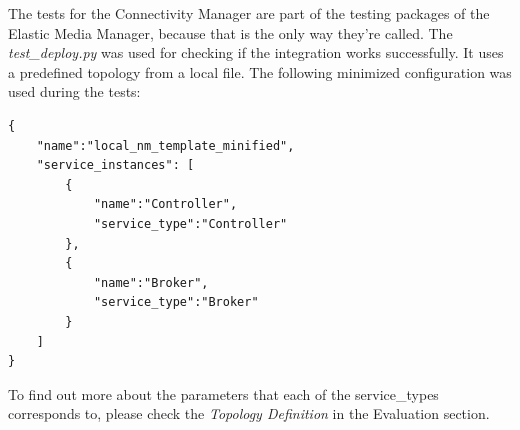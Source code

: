 The tests for the Connectivity Manager are part of the testing packages of the Elastic Media Manager, because that is the only way they're called. The \textit{test\_deploy.py} was used for checking if the integration works successfully.  It uses a predefined topology from a local file. The following minimized configuration was used during the tests:
\begin{lstlisting}
{
    "name":"local_nm_template_minified",
    "service_instances": [
        {
            "name":"Controller",
            "service_type":"Controller"
        },
        {
            "name":"Broker",
            "service_type":"Broker"
        }
    ]
}
\end{lstlisting}

To find out more about the parameters that each of the service\_types corresponds to, please check the \textit{Topology Definition} %
in the Evaluation section.